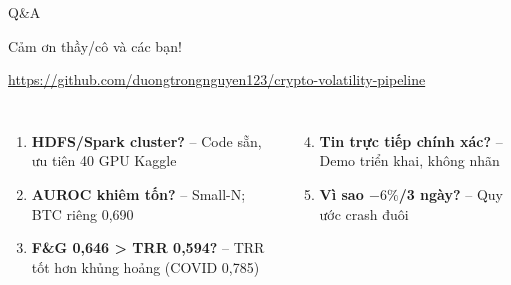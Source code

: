 \documentclass[10pt,aspectratio=169]{beamer}
\begin{document}
{
\begin{frame}[plain]
  \centering
  \vspace{1.5cm}
  {\fontsize{32}{40}\selectfont\color{cgreen} Q\&A}
  \vspace{0.4cm}

  {\Large Cảm ơn thầy/cô và các bạn!}
  \vspace{0.3cm}

  {\footnotesize \url{https://github.com/duongtrongnguyen123/crypto-volatility-pipeline}}

  \vspace{0.5cm}
  \begin{columns}[T]
    \begin{enumerate}
      \item \textbf{HDFS/Spark cluster?} -- Code sẵn, ưu tiên 40 GPU Kaggle
      \item \textbf{AUROC khiêm tốn?} -- Small-N; BTC riêng 0,690
      \item \textbf{F\&G 0,646 > TRR 0,594?} -- TRR tốt hơn khủng hoảng (COVID 0,785)
    \end{enumerate}

    \begin{enumerate}
      \setcounter{enumi}{3}
      \item \textbf{Tin trực tiếp chính xác?} -- Demo triển khai, không nhãn
      \item \textbf{Vì sao $-6\%$/3 ngày?} -- Quy ước crash đuôi
    \end{enumerate}
  \end{columns}
\end{frame}
}
\end{document}
